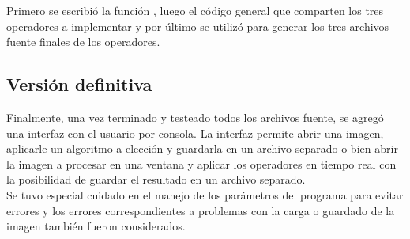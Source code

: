 Primero se escribi\'o la funci\'on , luego el c\'odigo general que comparten los tres operadores a 
implementar y por \'ultimo se utiliz\'o para generar los tres archivos fuente finales de los operadores.


\subsection{Versi\'on definitiva}
Finalmente, una vez terminado y testeado todos los archivos fuente, se agreg\'o una interfaz con el usuario por 
consola. La interfaz permite abrir una imagen, aplicarle un algoritmo a elecci\'on y guardarla en un archivo 
separado o bien abrir la imagen a procesar en una ventana y aplicar los operadores en tiempo real con la 
posibilidad de guardar el resultado en un archivo separado. \\
\indent Se tuvo especial cuidado en el manejo de los par\'ametros del programa para evitar errores y los errores 
correspondientes a problemas con la carga o guardado de la imagen tambi\'en fueron considerados.

\pagebreak
